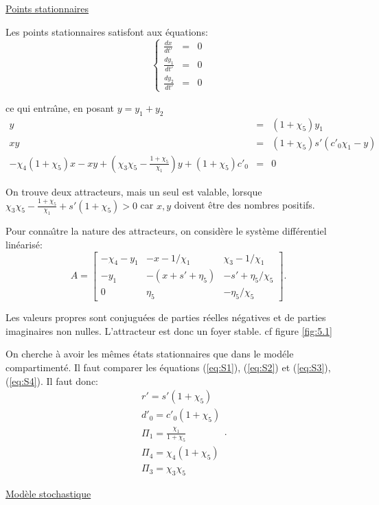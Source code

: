 \documentclass{article}
\begin{document}
\underline{Points stationnaires}

Les points stationnaires satisfont aux {\'e}quations:
\[
  \left \{
 \begin{array}{lll}
\frac{dx}{dt'} & = & 0 \\
\frac{dy_1}{dt'} & = & 0 \\
\frac{dy_2}{dt'} & = & 0
\end{array} \right.
\]

ce qui entra{\^\i}ne, en posant $y=y_1+y_2$
\begin{eqnarray}
y & = & (1+\chi_5)y_1 \\
xy & = & (1+\chi_5)s'(c'_0\chi_1-y) \label{eq:S1}  \\
-\chi_4(1+\chi_5)x-xy+(\chi_3\chi_5-\frac{1+\chi_5}{\chi_1})y+(1+\chi_5)c'_0 & = &  0 \label{eq:S2}
\end {eqnarray}


On trouve deux attracteurs, mais un seul est valable, lorsque $\chi_3\chi_5 - \frac{1+\chi_5}{\chi_1}+s'(1+\chi_5) > 0$ car $x,y$ doivent {\^e}tre des nombres positifs.

Pour conna{\^\i}tre la nature des attracteurs, on consid{\`e}re le syst{\`e}me diff{\'e}rentiel lin{\'e}aris{\'e}:
\[
A=\left[
\begin{array}{lll}
-\chi_4-y_1 & -x-1/\chi_1 & \chi_3-1/\chi_1 \\
-y_1 & -(x+s'+\eta_5) & -s'+\eta_5/\chi_5 \\
0  & \eta_5 & -\eta_5/\chi_5
\end{array} \right].
\]

Les valeurs propres sont conjugu{\'e}es de parties r{\'e}elles n{\'e}gatives
et de parties imaginaires  non nulles.
 L'attracteur est donc un foyer stable. cf figure \ref{fig:5.1}




On cherche {\`a} avoir les m{\^e}mes {\'e}tats stationnaires que dans le mod{\'e}le compartiment{\'e}. Il faut comparer les {\'e}quations (\ref{eq:S1}), (\ref{eq:S2}) et (\ref{eq:S3}), (\ref{eq:S4}).
Il faut donc:
\[
\begin{split}
& r'=s'(1+\chi_5) \\
& d'_0=c'_0(1+\chi_5) \\
& \Pi_1=\frac{\chi_1}{1+\chi_5} \\
& \Pi_4=\chi_4(1+\chi_5) \\
& \Pi_3=\chi_3\chi_5
\end{split}
.\]

\underline{Mod{\`e}le stochastique}
\end{document}
